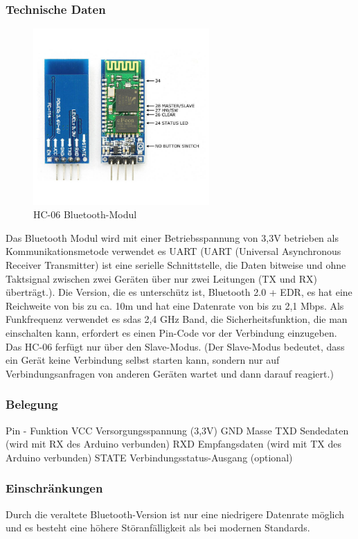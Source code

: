 \subsubsection{Technische Daten}
\begin{figure}[H]
    \centering
    \includegraphics[width=0.6\textwidth]{img/Hardware/hc06.png}
    \caption{HC-06 Bluetooth-Modul}
    \label{fig:hc06}
\end{figure}
Das Bluetooth Modul wird mit einer Betriebsspannung von 3,3V betrieben als Kommunikationsmetode verwendet es UART 
(UART (Universal Asynchronous Receiver Transmitter) ist eine serielle Schnittstelle,
die Daten bitweise und ohne Taktsignal zwischen zwei Geräten über nur zwei Leitungen (TX und RX) überträgt.).
%
Die Version, die es unterschütz ist, Bluetooth 2.0 + EDR, es hat eine Reichweite von bis zu ca. 10m und hat eine Datenrate von bis zu 2,1 Mbps.
%
Als Funkfrequenz verwendet es sdas 2,4 GHz Band, die Sicherheitsfunktion,
die man einschalten kann, erfordert es einen Pin-Code vor der Verbindung einzugeben.
%
Das HC-06 ferfügt nur über den Slave-Modus.
%
(Der Slave-Modus bedeutet, dass ein Gerät keine Verbindung selbst starten kann,
sondern nur auf Verbindungsanfragen von anderen Geräten wartet und dann darauf reagiert.)
\subsubsection{Belegung}
Pin	-	Funktion
VCC	Versorgungsspannung (3,3V)
GND	Masse
TXD	Sendedaten (wird mit RX des Arduino verbunden)
RXD	Empfangsdaten (wird mit TX des Arduino verbunden)
STATE	Verbindungsstatus-Ausgang (optional)

\subsubsection{Einschränkungen}
Durch die veraltete Bluetooth-Version ist nur eine niedrigere Datenrate möglich
und es besteht eine höhere Störanfälligkeit als bei modernen Standards.
%
